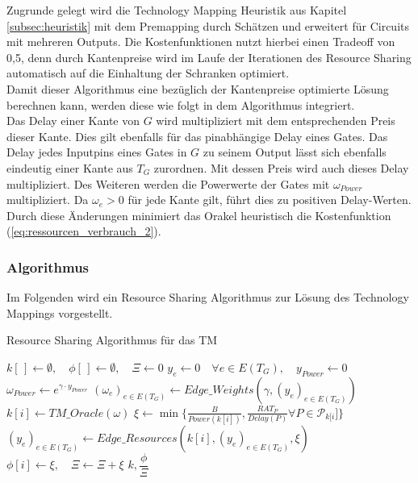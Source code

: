 \documentclass[11pt, a4paper, german]{article}
\newcommand{\TM}{Technology  Mapping }
\begin{document}
Zugrunde gelegt wird die \TM Heuristik aus Kapitel \ref{subsec:heuristik} mit dem Premapping durch Schätzen und erweitert für Circuits mit mehreren Outputs. Die Kostenfunktionen nutzt hierbei einen Tradeoff von 0,5, denn durch Kantenpreise wird im Laufe der Iterationen des Resource Sharing automatisch auf die Einhaltung der Schranken optimiert. \\
Damit dieser Algorithmus eine bezüglich der Kantenpreise optimierte Lösung berechnen kann, werden diese wie folgt in dem Algorithmus integriert. \\
Das Delay einer Kante von $G$ wird multipliziert mit dem entsprechenden Preis dieser Kante. Dies gilt ebenfalls für das pinabhängige Delay eines Gates. Das Delay jedes Inputpins eines Gates in $G$ zu seinem Output lässt sich ebenfalls eindeutig einer Kante aus $T_G$ zurordnen. Mit dessen Preis wird auch dieses Delay multipliziert. Des Weiteren werden die Powerwerte der Gates mit $\omega_{Power}$ multipliziert. Da $\omega_e >0$ für jede Kante gilt, führt dies zu positiven Delay-Werten. 
Durch diese Änderungen minimiert das Orakel heuristisch die Kostenfunktion (\ref{eq:ressourcen_verbrauch_2}).


\subsubsection{Algorithmus}
Im Folgenden wird ein Resource Sharing Algorithmus zur Lösung des Technology Mappings vorgestellt. \\

\LinesNumbered
\begin{algorithm}[H]
\DontPrintSemicolon
\caption{Resource Sharing Algorithmus für das TM}

   $k[\,] \gets \emptyset, \quad \phi[\,] \gets \emptyset, \quad \Xi \gets 0 $\;
  $y_e \gets 0 \quad \forall e \in E(T_G), \quad y_{Power} \gets 0$\;
     {
        $\omega_{Power} \gets e^{\gamma \cdot y_{Power}}$\;
        $(\omega_e)_{e \in E(T_G)} \gets Edge\_Weights(\gamma, (y_e)_{e \in E(T_G)})$\;
        $k[i] \gets TM\_Oracle(\omega)$\;
        $\xi \gets \min \{ \frac{B}{Power(k[i])}, \frac{RAT_P}{Delay(P)} \forall P \in \mathcal{P}_{k[i}] \}$\;
        $(y_e)_{e \in E(T_G)} \gets Edge\_Resources(k[i], (y_e)_{e \in E(T_G)}, \xi)$\;
        $\phi[i] \gets \xi, \quad \Xi \gets \Xi + \xi$
     }
     \Return $k,\dfrac{\phi}{\Xi}$
\end{algorithm}\ \\
\end{document}
